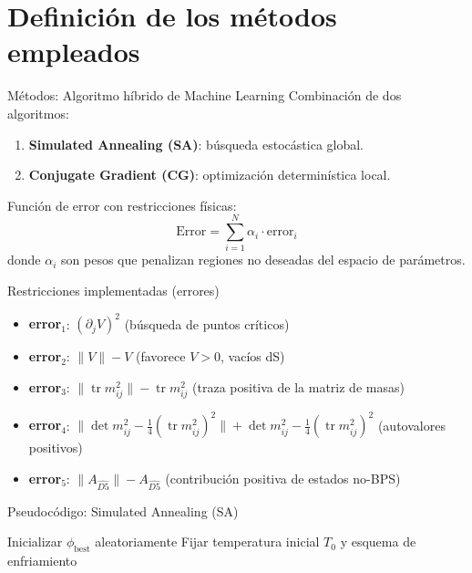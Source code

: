 \documentclass[aspectratio=169]{beamer} %
\begin{document}
\section{Definición de los métodos empleados}

\begin{frame}{Métodos: Algoritmo híbrido de Machine Learning}
    Combinación de dos algoritmos:
    \begin{enumerate}
        \item \textbf{Simulated Annealing (SA)}: búsqueda estocástica global.
        \item \textbf{Conjugate Gradient (CG)}: optimización determinística local.
    \end{enumerate}
    
    Función de error con restricciones físicas:
    \[
    \text{Error} = \sum_{i=1}^{N} \alpha_i \cdot \text{error}_i
    \]
    donde \(\alpha_i\) son pesos que penalizan regiones no deseadas del espacio de parámetros.
\end{frame}

\begin{frame}{Restricciones implementadas (errores)}
    \begin{itemize}
        \item \textbf{error\(_1\)}: \((\partial_j V)^2\) (búsqueda de puntos críticos)
        \item \textbf{error\(_2\)}: \(\|V\| - V\) (favorece \(V>0\), vacíos dS)
        \item \textbf{error\(_3\)}: \(\|\operatorname{tr} m_{ij}^2\| - \operatorname{tr} m_{ij}^2\) (traza positiva de la matriz de masas)
        \item \textbf{error\(_4\)}: \(\|\det m_{ij}^2 - \frac{1}{4}(\operatorname{tr} m_{ij}^2)^2\| + \det m_{ij}^2 - \frac{1}{4}(\operatorname{tr} m_{ij}^2)^2\) (autovalores positivos)
        \item \textbf{error\(_5\)}: \(\|A_{\widehat{D5}}\| - A_{\widehat{D5}}\) (contribución positiva de estados no-BPS)
    \end{itemize}
\end{frame}

\begin{frame}{Pseudocódigo: Simulated Annealing (SA)}
    \begin{algorithm}[H]
        \DontPrintSemicolon
        \caption{Búsqueda global con SA}
        Inicializar \(\phi_{\text{best}}\) aleatoriamente\;
        Fijar temperatura inicial \(T_0\) y esquema de enfriamiento\;
    \end{algorithm}
\end{frame}
\end{document}
